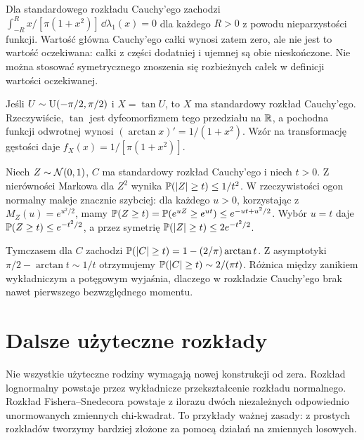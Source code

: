 \begin{przyklad}
Dla standardowego rozkładu Cauchy'ego zachodzi
$\int_{-R}^{R}x/[\pi(1+x^2)]\,\dd\lambda_1(x)=0$
dla każdego $R>0$ z powodu nieparzystości funkcji.
Wartość główna Cauchy'ego całki wynosi zatem zero,
ale nie jest to wartość oczekiwana: całki z części dodatniej
i ujemnej są obie nieskończone. Nie można stosować
symetrycznego znoszenia się rozbieżnych całek w definicji
wartości oczekiwanej.
\end{przyklad}

\begin{przyklad}
Jeśli $U\sim\operatorname{U}(-\pi/2,\pi/2)$ i $X=\tan U$,
to $X$ ma standardowy rozkład Cauchy'ego. Rzeczywiście,
$\tan$ jest dyfeomorfizmem tego przedziału na $\mathbb{R}$,
a pochodna funkcji odwrotnej wynosi
$(\arctan x)'=1/(1+x^2)$.
Wzór na transformację gęstości daje $f_X(x)=1/[\pi(1+x^2)]$.
\end{przyklad}


\begin{przyklad}
Niech $Z\sim\mathcal{N}(0,1)$, $C$ ma standardowy rozkład
Cauchy'ego i niech $t>0$. Z nierówności Markowa
dla $Z^2$ wynika $\mathbb{P}(|Z|\geq t)\leq1/t^2$.
W rzeczywistości ogon normalny maleje znacznie szybciej:
dla każdego $u>0$, korzystając z
$M_Z(u)=e^{u^2/2}$, mamy
$\mathbb{P}(Z\geq t)=\mathbb{P}(e^{uZ}\geq e^{ut})
\leq e^{-ut+u^2/2}$.
Wybór $u=t$ daje $\mathbb{P}(Z\geq t)\leq e^{-t^2/2}$,
a przez symetrię $\mathbb{P}(|Z|\geq t)\leq2e^{-t^2/2}$.

Tymczasem dla $C$ zachodzi
$\mathbb{P}(|C|\geq t)=1-(2/\pi)\arctan t$.
Z asymptotyki $\pi/2-\arctan t\sim1/t$
otrzymujemy $\mathbb{P}(|C|\geq t)\sim 2/(\pi t)$.
Różnica między zanikiem wykładniczym a potęgowym
wyjaśnia, dlaczego w rozkładzie Cauchy'ego brak nawet
pierwszego bezwzględnego momentu.
\end{przyklad}

\section{Dalsze użyteczne rozkłady}
Nie wszystkie użyteczne rodziny wymagają nowej konstrukcji od zera.
Rozkład lognormalny powstaje przez wykładnicze przekształcenie
rozkładu normalnego. Rozkład Fishera--Snedecora powstaje z ilorazu
dwóch niezależnych odpowiednio unormowanych zmiennych chi-kwadrat.
To przykłady ważnej zasady: z prostych rozkładów tworzymy
bardziej złożone za pomocą działań na zmiennych losowych.

